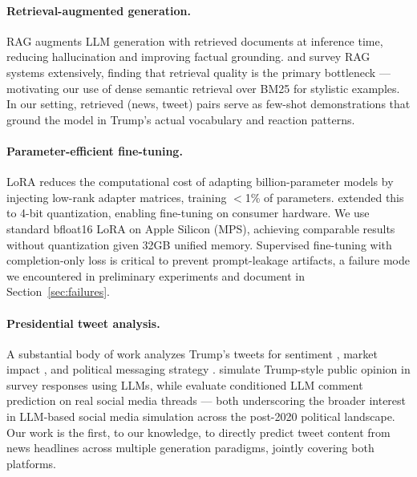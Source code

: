 \documentclass[11pt,a4paper]{article}
\begin{document}
\paragraph{Retrieval-augmented generation.}
RAG \citep{lewis2020retrieval} augments LLM generation with retrieved documents at inference time, reducing hallucination and improving factual grounding. \citet{gupta2024ragsurvey} and \citet{gao2024retrievalaugmented} survey RAG systems extensively, finding that retrieval quality is the primary bottleneck — motivating our use of dense semantic retrieval over BM25 for stylistic examples. In our setting, retrieved (news, tweet) pairs serve as few-shot demonstrations that ground the model in Trump's actual vocabulary and reaction patterns.

\paragraph{Parameter-efficient fine-tuning.}
LoRA \citep{hu2022lora} reduces the computational cost of adapting billion-parameter models by injecting low-rank adapter matrices, training $<$1\% of parameters. \citet{dettmers2024qlora} extended this to 4-bit quantization, enabling fine-tuning on consumer hardware. We use standard bfloat16 LoRA on Apple Silicon (MPS), achieving comparable results without quantization given 32GB unified memory. Supervised fine-tuning with completion-only loss \citep{ouyang2022instructgpt} is critical to prevent prompt-leakage artifacts, a failure mode we encountered in preliminary experiments and document in Section~\ref{sec:failures}.

\paragraph{Presidential tweet analysis.}
A substantial body of work analyzes Trump's tweets for sentiment \citep{wang2017sentiment}, market impact \citep{bollen2011twitter,zhang2016predicting}, and political messaging strategy \citep{wells2016trump}. \citet{jiang2024trumppolls} simulate Trump-style public opinion in survey responses using LLMs, while \citet{schwager2026simulate} evaluate conditioned LLM comment prediction on real social media threads — both underscoring the broader interest in LLM-based social media simulation across the post-2020 political landscape. Our work is the first, to our knowledge, to directly predict tweet content from news headlines across multiple generation paradigms, jointly covering both platforms.
\end{document}
